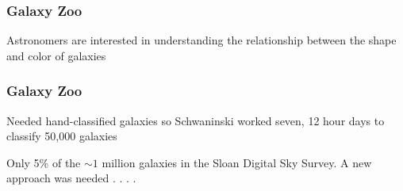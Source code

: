 \documentclass[aspectratio=169]{beamer}
\begin{document}
\begin{frame}
\frametitle{Galaxy Zoo}

Astronomers are interested in understanding the relationship between the shape and color of galaxies

\begin{figure}
  \centering
  \hspace{0in}
\end{figure}

\end{frame}
\begin{frame}
\frametitle{Galaxy Zoo}

Needed hand-classified galaxies so Schwaninski worked seven, 12 hour days to classify 50,000 galaxies
\begin{center}
\end{center}
\pause
\vfill
Only 5\% of the $\sim1$ million galaxies in the Sloan Digital Sky Survey.  A new approach was needed . . . .
\end{frame}
\end{document}
